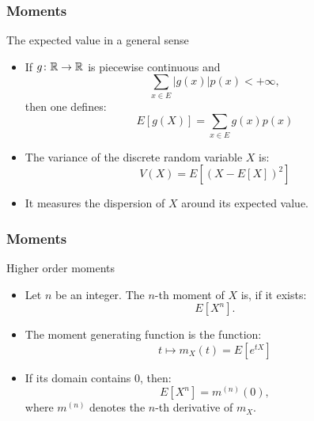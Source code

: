 \documentclass[main.tex]{subfiles}
\begin{document}
\begin{frame}
    \frametitle{Moments}
\begin{block}{The expected value in a general sense}
    \begin{itemize} 
        \item<+-> If $g \colon \mathbb{R} \to \mathbb{R}$ is piecewise continuous and
        \begin{equation}
            \sum_{x \in E} \lvert g(x) \rvert p(x) < +\infty,
        \end{equation}
        then one defines:
        \begin{equation}
            E\left[ g(X) \right] = \sum_{x \in E}  g(x) p(x)
        \end{equation}
    \item<+-> The variance of the discrete random variable $X$ is:
    \begin{equation}
        V(X) = E \left[ \left( X - E\left[ X \right] \right)^2 \right]
    \end{equation}
    \item<+-> It measures the dispersion of $X$ around its expected value.
    \end{itemize}
\end{block}
\end{frame}
\begin{frame}
    \frametitle{Moments}
\begin{block}{Higher order moments}
    \begin{itemize} 
        \item<+-> Let $n$ be an integer. The $n$-th moment of $X$ is, if it
        exists:
        \begin{equation}
            E\left[ X^n \right].
        \end{equation}
        \item<+-> The moment generating function is the function:
        \begin{equation}
            t \mapsto m_X(t) = E\left[ e^{tX} \right]
        \end{equation}
    \item <+-> If its domain contains $0$, then:
    \begin{equation}
        E\left[ X^n \right] = m^{(n)}(0),
    \end{equation}
    where $m^{(n)}$ denotes the $n$-th derivative of $m_X$.
\end{itemize}
\end{block}
\end{frame}
\end{document}
